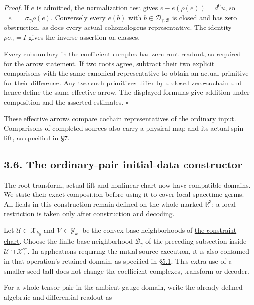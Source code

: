 \documentclass[
  english,
  11pt,
  reqno]{amsart}
\begin{document}
\emph{Proof.} If \(e\) is admitted, the normalization test gives
\(e-e(\rho(e))=d^0u\), so \([e]=\sigma_\gamma\rho(e)\). Conversely every
\(e(b)\) with \(b\in\mathscr D_{\gamma,\mathcal B}\) is closed and has
zero obstruction, as does every actual cohomologous representative. The
identity \(\rho\sigma_\gamma=I\) gives the inverse assertion on classes.

Every coboundary in the coefficient complex has zero root readout, as
required for the arrow statement. If two roots agree, subtract their two
explicit comparisons with the same canonical representative to obtain an
actual primitive for their difference. Any two such primitives differ by
a closed zero-cochain and hence define the same effective arrow. The
displayed formulas give addition under composition and the asserted
estimates. \hfill\(\square\)

These effective arrows compare cochain representatives of the ordinary
input. Comparisons of completed sources also carry a physical map and
its actual spin lift, as specified in §7.

\subsection{3.6. The ordinary-pair initial-data
constructor}\label{the-ordinary-pair-initial-data-constructor}\label{sec:online-ordinary-data-construction}

The root transform, actual lift and nonlinear chart now have compatible
domains. We state their exact composition before using it to cover local
spacetime germs. All fields in this construction remain defined on the
whole marked \(\mathbb R^3\); a local restriction is taken only after
construction and decoding.

Let \(\mathcal U\subset\mathcal X_{k_0}\) and
\(\mathcal V\subset\mathcal Y_{k_0}\) be the convex base neighborhoods
of \hyperref[thm:online-chart-base-constraint-bijection]{the constraint
chart}. Choose the finite-base neighborhood \(\mathcal B_\gamma\) of the
preceding subsection inside \(\mathcal U\cap\mathcal X^\infty_\gamma\).
In applications requiring the initial source execution, it is also
contained in that operation's retained domain, as specified in
\hyperref[sec:submission-coverage-conventions]{§5.1}. This extra use of
a smaller seed ball does not change the coefficient complexes, transform
or decoder.

For a whole tensor pair in the ambient gauge domain, write the already
defined algebraic and differential readout as
\end{document}
